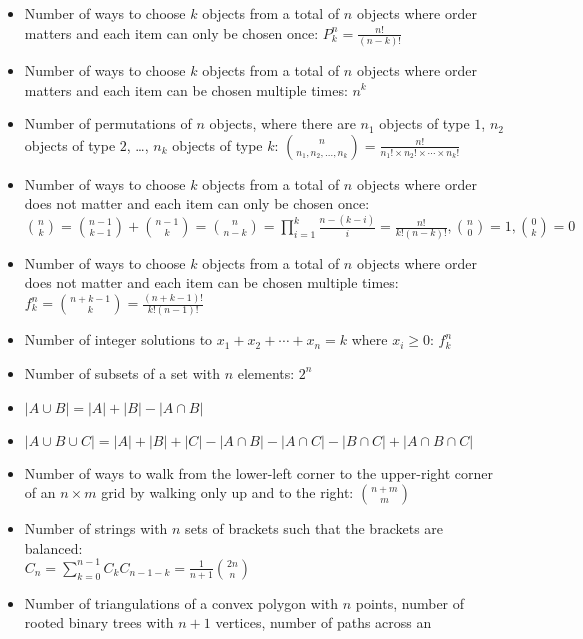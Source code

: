 \documentclass[8pt,a4paper]{amsart}
\begin{document}
\begin{itemize}
    \item Number of ways to choose $k$ objects from a total of $n$ objects
        where order matters and each item can only be chosen once: $P^n_k =
        \frac{n!}{(n-k)!}$
    \item Number of ways to choose $k$ objects from a total of $n$ objects
        where order matters and each item can be chosen multiple times: $n^k$
    \item Number of permutations of $n$ objects, where there are $n_1$ objects
        of type $1$, $n_2$ objects of type $2$, \ldots, $n_k$ objects of type
        $k$: $\binom{n}{n_1,n_2,\ldots,n_k} = \frac{n!}{n_1! \times n_2! \times
        \cdots \times n_k!}$
    \item Number of ways to choose $k$ objects from a total of $n$ objects
        where order does not matter and each item can only be chosen once: \\
        $\binom{n}{k} = \binom{n-1}{k-1} + \binom{n-1}k = \binom{n}{n-k} =
        \prod_{i=1}^k \frac{n-(k-i)}{i} = \frac{n!}{k!(n-k)!}, \binom n0 = 1,
        \binom 0k = 0$
    \item Number of ways to choose $k$ objects from a total of $n$ objects
        where order does not matter and each item can be chosen multiple times:
        $f^n_k = \binom{n+k-1}{k} = \frac{(n+k-1)!}{k!(n-1)!}$
    \item Number of integer solutions to $x_1 + x_2 + \cdots + x_n = k$ where
        $x_i \geq 0$: $f^n_k$
    \item Number of subsets of a set with $n$ elements: $2^n$
    \item $|A \cup B| = |A| + |B| - |A \cap B|$
    \item $|A \cup B \cup C| = |A| + |B| + |C| - |A \cap B| - |A \cap C| - |B
        \cap C| + |A \cap B \cap C|$
    \item Number of ways to walk from the lower-left corner to the upper-right
        corner of an $n\times m$ grid by walking only up and to the right:
        $\binom{n+m}{m}$
    \item Number of strings with $n$ sets of brackets such that the brackets
        are balanced: \\ $C_n = \sum_{k=0}^{n-1} C_kC_{n-1-k} =
        \frac{1}{n+1}\binom{2n}n$
    \item Number of triangulations of a convex polygon with $n$ points, number
        of rooted binary trees with $n+1$ vertices, number of paths across an

\end{itemize}
\end{document}
